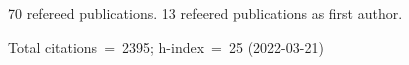 70 refereed publications. 13 refeered publications as first author.

Total citations~=~2395; h-index~=~25 (2022-03-21)